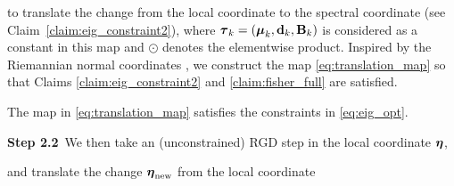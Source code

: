 \vspace{-0.2cm}
to translate the change from the local coordinate to the spectral coordinate (see  Claim~\ref{claim:eig_constraint2}), where $\mbox{$\mbox{$\boldsymbol{\tau}$}$}_k=(\mbox{$\mbox{$\boldsymbol{\mu}$}$}_k,\mbox{$\mbox{$\mathbf{d}$}$}_k,\mbox{$\mbox{$\mathbf{B}$}$}_k)$ is considered as a constant in this map and $\odot$ denotes the elementwise product. %
Inspired by the Riemannian normal coordinates \citep{lin2023simplifying},
we construct the map \eqref{eq:translation_map} so that Claims 
\ref{claim:eig_constraint2}
and 
\ref{claim:fisher_full} are satisfied.
%

\begin{claim}
\label{claim:eig_constraint2}
The map in \eqref{eq:translation_map} satisfies the constraints in \eqref{eq:eig_opt}.
\end{claim}
\vspace{-0.1cm}

\begin{comment}
\begin{claim}
\label{claim:eig_constraint}
{\bf Uniqueness of the Local Coordinates}
The map in  \eqref{eq:translation_map}, which is like the eigendecomposition,
is one-to-one if $\vd$ has no repeated entries
(see Appx.~\ref{app:claim4_proof} for a proof).
\end{claim}
\end{comment}

{\bf Step 2.2}\,
We then take an (unconstrained) RGD step in the local coordinate $\mbox{$\mbox{$\boldsymbol{\eta}$}$}$,

 \vspace{-0.5cm}

\vspace{-0.2cm}
and translate the change $\mbox{$\mbox{$\boldsymbol{\eta}$}$}_{\text{new}}$
from the local coordinate

 \vspace{-0.45cm}

